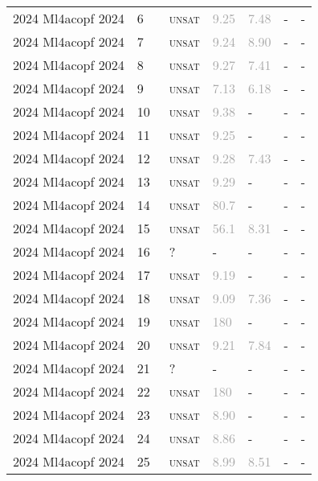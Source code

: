 \begin{center}
{\begin{longtable}{@{}lllllll@{}}
2024 Ml4acopf 2024 & 6 & ~\textsc{unsat} & \textcolor{darkgray}{9.25} & \textcolor{darkgray}{7.48} & - & - \\
2024 Ml4acopf 2024 & 7 & ~\textsc{unsat} & \textcolor{darkgray}{9.24} & \textcolor{darkgray}{8.90} & - & - \\
2024 Ml4acopf 2024 & 8 & ~\textsc{unsat} & \textcolor{darkgray}{9.27} & \textcolor{darkgray}{7.41} & - & - \\
2024 Ml4acopf 2024 & 9 & ~\textsc{unsat} & \textcolor{darkgray}{7.13} & \textcolor{darkgray}{6.18} & - & - \\
2024 Ml4acopf 2024 & 10 & ~\textsc{unsat} & \textcolor{darkgray}{9.38} & - & - & - \\
2024 Ml4acopf 2024 & 11 & ~\textsc{unsat} & \textcolor{darkgray}{9.25} & - & - & - \\
2024 Ml4acopf 2024 & 12 & ~\textsc{unsat} & \textcolor{darkgray}{9.28} & \textcolor{darkgray}{7.43} & - & - \\
2024 Ml4acopf 2024 & 13 & ~\textsc{unsat} & \textcolor{darkgray}{9.29} & - & - & - \\
2024 Ml4acopf 2024 & 14 & ~\textsc{unsat} & \textcolor{darkgray}{80.7} & - & - & - \\
2024 Ml4acopf 2024 & 15 & ~\textsc{unsat} & \textcolor{darkgray}{56.1} & \textcolor{darkgray}{8.31} & - & - \\
2024 Ml4acopf 2024 & 16 & ~? & - & - & - & - \\
2024 Ml4acopf 2024 & 17 & ~\textsc{unsat} & \textcolor{darkgray}{9.19} & - & - & - \\
2024 Ml4acopf 2024 & 18 & ~\textsc{unsat} & \textcolor{darkgray}{9.09} & \textcolor{darkgray}{7.36} & - & - \\
2024 Ml4acopf 2024 & 19 & ~\textsc{unsat} & \textcolor{darkgray}{180} & - & - & - \\
2024 Ml4acopf 2024 & 20 & ~\textsc{unsat} & \textcolor{darkgray}{9.21} & \textcolor{darkgray}{7.84} & - & - \\
2024 Ml4acopf 2024 & 21 & ~? & - & - & - & - \\
2024 Ml4acopf 2024 & 22 & ~\textsc{unsat} & \textcolor{darkgray}{180} & - & - & - \\
2024 Ml4acopf 2024 & 23 & ~\textsc{unsat} & \textcolor{darkgray}{8.90} & - & - & - \\
2024 Ml4acopf 2024 & 24 & ~\textsc{unsat} & \textcolor{darkgray}{8.86} & - & - & - \\
2024 Ml4acopf 2024 & 25 & ~\textsc{unsat} & \textcolor{darkgray}{8.99} & \textcolor{darkgray}{8.51} & - & - \\

\end{longtable}}
\end{center}
